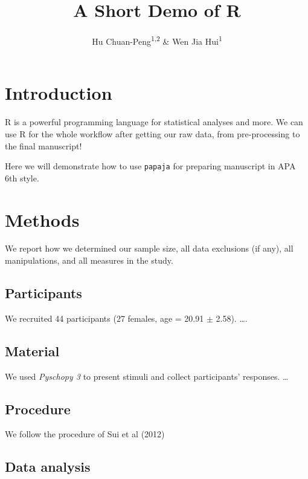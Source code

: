 \documentclass[
  english,
  man,floatsintext]{apa6}
\title{A Short Demo of R}
\author{Hu Chuan-Peng\textsuperscript{1,2} \& Wen Jia Hui\textsuperscript{1}}
\date{}
\affiliation{\vspace{0.5cm}\textsuperscript{1} Nanjing Normal University\\\textsuperscript{2} Chinese Open Science Network}
\begin{document}
\maketitle

\section{Introduction}\label{introduction}

R is a powerful programming language for statistical analyses and more. We can use R for the whole workflow after getting our raw data, from pre-processing to the final manuscript!

Here we will demonstrate how to use \texttt{papaja} for preparing manuscript in APA 6th style.

\section{Methods}\label{methods}

We report how we determined our sample size, all data exclusions (if any), all manipulations, and all measures in the study.

\subsection{Participants}\label{participants}

We recruited 44 participants (27 females, age = 20.91 \(\pm\) 2.58). \ldots.

\subsection{Material}\label{material}

We used \emph{Pyschopy 3} to present stimuli and collect participants' responses. \ldots{}

\subsection{Procedure}\label{procedure}

We follow the procedure of Sui et al (2012)

\subsection{Data analysis}\label{data-analysis}
\end{document}

